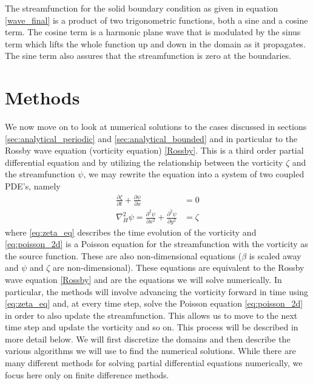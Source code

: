\documentclass[12pt]{article}
\numberwithin{figure}{section}
\numberwithin{table}{section}
\begin{document}
\noindent The streamfunction for the solid boundary condition as given in equation \eqref{wave_final} is a product of two trigonometric functions, both a sine and a cosine term. The cosine term is a harmonic plane wave that is modulated by the sinus term which lifts the whole function up and down in the domain as it propagates. The sine term also assures that the streamfunction is zero at the boundaries. \\








\section{Methods} \label{sec:methods}
We now move on to look at numerical solutions to the cases discussed in sections \ref{sec:analytical_periodic} and \ref{sec:analytical_bounded} and in particular to the Rossby wave equation (vorticity equation) \eqref{Rossby}. This is a third order partial differential equation and by utilizing the relationship between the vorticity $\zeta$ and the streamfunction $\psi$, we may rewrite the equation into a system of two coupled PDE's, namely
\begin{align}
	\frac{\partial\zeta}{\partial t}+\frac{\partial\psi}{\partial x}&=0 \label{eq:zeta_eq} \\[0.20cm]
    \nabla^2_H\psi=\frac{\partial^2\psi}{\partial x^2}+\frac{\partial^2\psi}{\partial y^2}&=\zeta \label{eq:poisson_2d}
\end{align}
where \eqref{eq:zeta_eq} describes the time evolution of the vorticity and \eqref{eq:poisson_2d} is a Poisson equation for the streamfunction with the vorticity as the source function. These are also non-dimensional equations ($\beta$ is scaled away and $\psi$ and $\zeta$ are non-dimensional). These equations are equivalent to the Rossby wave equation \eqref{Rossby} and are the equations we will solve numerically. In particular, the methods will involve advancing the vorticity forward in time using \eqref{eq:zeta_eq} and, at every time step, solve the Poisson equation \eqref{eq:poisson_2d} in order to also update the streamfunction. This allows us to move to the next time step and update the vorticity and so on. This process will be described in more detail below. We will first discretize the domains and then describe the various algorithms we will use to find the numerical solutions. While there are many different methods for solving partial differential equations numerically, we focus here only on finite difference methods.
\end{document}
